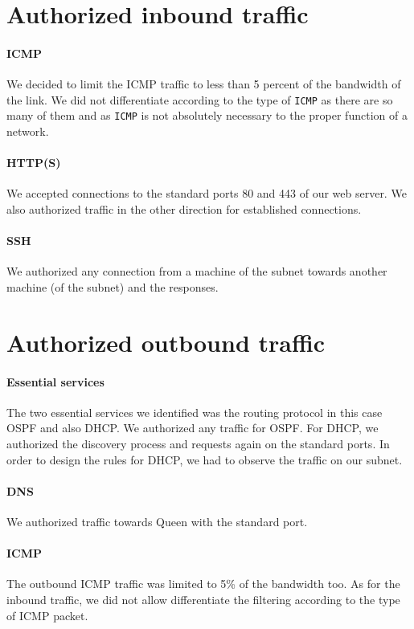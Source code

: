 \documentclass[a4paper,titlepage]{article}
\begin{document}
\section{Authorized inbound traffic}
\paragraph{ICMP} We decided to limit the ICMP traffic to less than 5 percent of the bandwidth of the link. We did not differentiate according to the type of \texttt{ICMP} as there are so many of them and as \texttt{ICMP} is not absolutely necessary to the proper function of a network.

\paragraph{HTTP(S)} We accepted connections to the standard ports 80 and 443 of our web server. We also authorized traffic in the other direction for established connections.

\paragraph{SSH} We authorized any connection from a machine of the subnet towards another machine (of the subnet) and the responses.

\section{Authorized outbound traffic}
\paragraph{Essential services} The two essential services we identified was the routing protocol in this case OSPF and also DHCP. We authorized any traffic for OSPF. For DHCP, we authorized the discovery process and requests again on the standard ports. In order to design the rules for DHCP, we had to observe the traffic on our subnet. 

\paragraph{DNS} We authorized traffic towards Queen with the standard port.

\paragraph{ICMP} The outbound ICMP traffic was limited to 5\% of the bandwidth too. As for the inbound traffic, we did not allow differentiate the filtering according to the type of ICMP packet.
\end{document}
